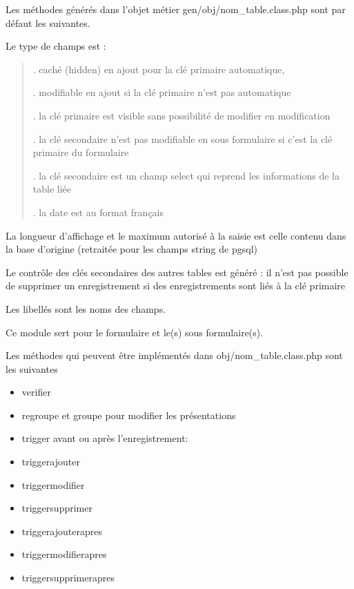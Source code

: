 \documentclass[letterpaper,10pt,french]{manual}
\begin{document}
Les méthodes  générés dans l'objet métier gen/obj/nom\_table.class.php sont par défaut les suivantes.

Le type de champs est :
\begin{quote}

. caché (hidden) en ajout pour la clé primaire automatique,

. modifiable en ajout si la clé primaire n'est pas automatique

. la clé primaire est visible sans possibilité de modifier en modification

. la clé secondaire n'est pas modifiable en sous formulaire si c'est la clé primaire du formulaire

. la clé secondaire est un champ select qui reprend les informations de la table liée

. la date est au format français
\end{quote}

La longueur d'affichage et le maximum autorisé à la saisie est celle contenu dans la base d'origine (retraitée pour les champs string de pgsql)

Le contrôle des clés secondaires des autres tables est généré : il n'est pas possible de supprimer un enregistrement si des enregistrements sont liés à la clé primaire

Les libellés sont les noms des champs.

Ce module sert pour le formulaire et le(s) sous formulaire(s).

Les méthodes qui peuvent être implémentés dans obj/nom\_table.class.php sont les suivantes
\begin{itemize}
\item {} 
verifier

\item {} 
regroupe et groupe pour modifier les présentations

\item {} 
trigger avant ou après l'enregistrement:

\item {} 
triggerajouter

\item {} 
triggermodifier

\item {} 
triggersupprimer

\item {} 
triggerajouterapres

\item {} 
triggermodifierapres

\item {} 
triggersupprimerapres

\end{itemize}
\end{document}
